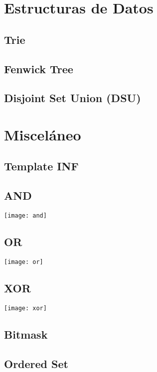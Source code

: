 \section{Estructuras de Datos}

\subsection{Trie}

\subsection{Fenwick Tree}

\subsection{Disjoint Set Union (DSU)}

\section{Misceláneo}

\subsection{Template INF}

\subsection{AND}
\texttt{[image: and]}

\subsection{OR}
\texttt{[image: or]}

\subsection{XOR}
\texttt{[image: xor]}

\subsection{Bitmask}

\subsection{Ordered Set}

